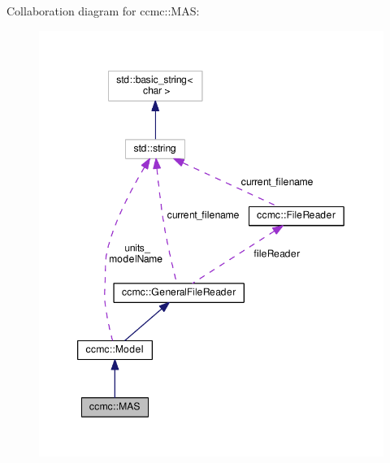 Collaboration diagram for ccmc\-:\-:M\-A\-S\-:
\nopagebreak
\begin{figure}[H]
\begin{center}
\leavevmode
\includegraphics[width=349pt]{classccmc_1_1_m_a_s__coll__graph}
\end{center}
\end{figure}
